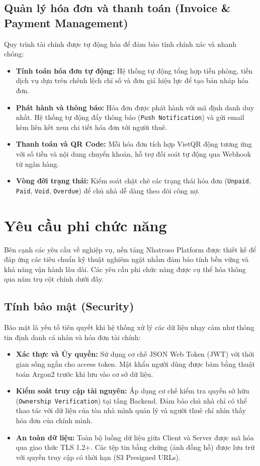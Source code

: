 \subsection{Quản lý hóa đơn và thanh toán (Invoice \& Payment Management)}
Quy trình tài chính được tự động hóa để đảm bảo tính chính xác và nhanh chóng:
\begin{itemize}
    \item \textbf{Tính toán hóa đơn tự động:} Hệ thống tự động tổng hợp tiền phòng, tiền dịch vụ dựa trên chênh lệch chỉ số và đơn giá hiệu lực để tạo bản nháp hóa đơn.
    \item \textbf{Phát hành và thông báo:} Hóa đơn được phát hành với mã định danh duy nhất. Hệ thống tự động đẩy thông báo (\texttt{Push Notification}) và gửi email kèm liên kết xem chi tiết hóa đơn tới người thuê.
    \item \textbf{Thanh toán và QR Code:} Mỗi hóa đơn tích hợp VietQR \cite{VietQR} động tương ứng với số tiền và nội dung chuyển khoản, hỗ trợ đối soát tự động qua Webhook từ ngân hàng.
    \item \textbf{Vòng đời trạng thái:} Kiểm soát chặt chẽ các trạng thái hóa đơn (\texttt{Unpaid}, \texttt{Paid}, \texttt{Void}, \texttt{Overdue}) để chủ nhà dễ dàng theo dõi công nợ.
\end{itemize}

\section{Yêu cầu phi chức năng}

Bên cạnh các yêu cầu về nghiệp vụ, nền tảng Nhatroso Platform được thiết kế để đáp ứng các tiêu chuẩn kỹ thuật nghiêm ngặt nhằm đảm bảo tính bền vững và khả năng vận hành lâu dài. Các yêu cầu phi chức năng được cụ thể hóa thông qua năm trụ cột chính dưới đây.

\subsection{Tính bảo mật (Security)}
Bảo mật là yếu tố tiên quyết khi hệ thống xử lý các dữ liệu nhạy cảm như thông tin định danh cá nhân và hóa đơn tài chính:
\begin{itemize}
    \item \textbf{Xác thực và Ủy quyền:} Sử dụng cơ chế JSON Web Token (JWT) với thời gian sống ngắn cho access token. Mật khẩu người dùng được băm bằng thuật toán Argon2 trước khi lưu vào cơ sở dữ liệu.
    \item \textbf{Kiểm soát truy cập tài nguyên:} Áp dụng cơ chế kiểm tra quyền sở hữu (\texttt{Ownership Verification}) tại tầng Backend. Đảm bảo chủ nhà chỉ có thể thao tác với dữ liệu của tòa nhà mình quản lý và người thuê chỉ nhìn thấy hóa đơn của chính mình.
    \item \textbf{An toàn dữ liệu:} Toàn bộ luồng dữ liệu giữa Client và Server được mã hóa qua giao thức TLS 1.2+. Các tệp tin bằng chứng (ảnh đồng hồ) được lưu trữ với quyền truy cập có thời hạn (S3 Presigned URLs).
\end{itemize}

